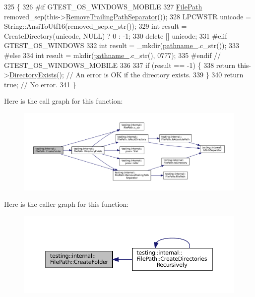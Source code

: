 \begin{DoxyCode}
325                                   \{
326 \textcolor{preprocessor}{#if GTEST\_OS\_WINDOWS\_MOBILE}
327   \hyperlink{classtesting_1_1internal_1_1FilePath_a3504a51accbca78a52fe586133ea5499}{FilePath} removed\_sep(this->\hyperlink{classtesting_1_1internal_1_1FilePath_ab47ada111cc940cf2359f6533bada6ca}{RemoveTrailingPathSeparator}());
328   LPCWSTR unicode = String::AnsiToUtf16(removed\_sep.c\_str());
329   \textcolor{keywordtype}{int} result = CreateDirectory(unicode, NULL) ? 0 : -1;
330   \textcolor{keyword}{delete} [] unicode;
331 \textcolor{preprocessor}{#elif GTEST\_OS\_WINDOWS}
332   \textcolor{keywordtype}{int} result = \_mkdir(\hyperlink{classtesting_1_1internal_1_1FilePath_a12ce28a0015f85604e0372230fa18d6e}{pathname\_}.c\_str());
333 \textcolor{preprocessor}{#else}
334   \textcolor{keywordtype}{int} result = mkdir(\hyperlink{classtesting_1_1internal_1_1FilePath_a12ce28a0015f85604e0372230fa18d6e}{pathname\_}.c\_str(), 0777);
335 \textcolor{preprocessor}{#endif  // GTEST\_OS\_WINDOWS\_MOBILE}
336 
337   \textcolor{keywordflow}{if} (result == -1) \{
338     \textcolor{keywordflow}{return} this->\hyperlink{classtesting_1_1internal_1_1FilePath_a74ba8435e822d77f79f137c38de9bfeb}{DirectoryExists}();  \textcolor{comment}{// An error is OK if the directory exists.}
339   \}
340   \textcolor{keywordflow}{return} \textcolor{keyword}{true};  \textcolor{comment}{// No error.}
341 \}
\end{DoxyCode}
Here is the call graph for this function\+:
\nopagebreak
\begin{figure}[H]
\begin{center}
\leavevmode
\includegraphics[width=350pt]{classtesting_1_1internal_1_1FilePath_ae3a455e7c9fc967c2443b703e958f8bd_cgraph}
\end{center}
\end{figure}
Here is the caller graph for this function\+:
\nopagebreak
\begin{figure}[H]
\begin{center}
\leavevmode
\includegraphics[width=350pt]{classtesting_1_1internal_1_1FilePath_ae3a455e7c9fc967c2443b703e958f8bd_icgraph}
\end{center}
\end{figure}
